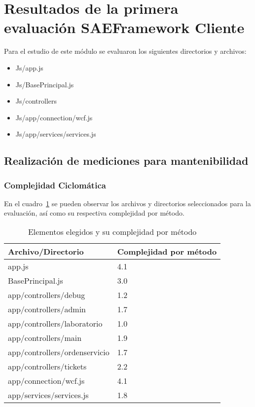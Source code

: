\section{Resultados de la primera evaluación SAEFramework Cliente}

Para el estudio de este módulo se evaluaron los siguientes directorios y archivos:
\begin{itemize}
\item Js/app.js
\item Js/BasePrincipal.js
\item Js/controllers
\item Js/app/connection/wcf.js
\item Js/app/services/services.js
\end{itemize}

\subsection{Realización de mediciones para mantenibilidad}
\subsubsection{Complejidad Ciclomática}

En el cuadro~\ref{table:JSCC} se pueden observar los archivos y directorios
seleccionados para la evaluación, así como su respectiva complejidad por método.
\begin{table}
  \small
\centering
    \begin{tabular}{|l|l|}
    \hline
    \textbf{Archivo/Directorio}            & \textbf{Complejidad por método} \\ \hline
    app.js                        & 4.1                    \\ \hline
    BasePrincipal.js              & 3.0                    \\ \hline
    app/controllers/debug         & 1.2                    \\ \hline
    app/controllers/admin         & 1.7                    \\ \hline
    app/controllers/laboratorio   & 1.0                    \\ \hline
    app/controllers/main          & 1.9                    \\ \hline
    app/controllers/ordenservicio & 1.7                    \\ \hline
    app/controllers/tickets       & 2.2                    \\ \hline
    app/connection/wcf.js         & 4.1                    \\ \hline
    app/services/services.js      & 1.8                    \\ \hline
    \end{tabular}
    \caption{Elementos elegidos y su complejidad por método}
    \label{table:JSCC}
\end{table}

